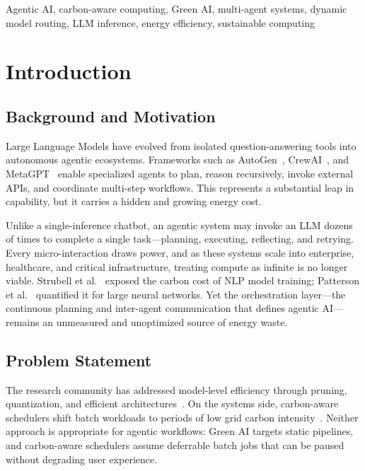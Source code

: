 \documentclass[journal]{IEEEtran}
\begin{document}
\begin{IEEEkeywords}
Agentic AI, carbon-aware computing, Green AI, multi-agent systems, dynamic
model routing, LLM inference, energy efficiency, sustainable computing
\end{IEEEkeywords}

\section{Introduction}

\subsection{Background and Motivation}

Large Language Models have evolved from isolated question-answering tools into
autonomous agentic ecosystems. Frameworks such as AutoGen~\cite{wu2023autogen},
CrewAI~\cite{moura2023crewai}, and MetaGPT~\cite{hong2024metagpt} enable
specialized agents to plan, reason recursively, invoke external APIs, and
coordinate multi-step workflows. This represents a substantial leap in
capability, but it carries a hidden and growing energy cost.

Unlike a single-inference chatbot, an agentic system may invoke an LLM dozens
of times to complete a single task—planning, executing, reflecting, and
retrying. Every micro-interaction draws power, and as these systems scale into
enterprise, healthcare, and critical infrastructure, treating compute as
infinite is no longer viable. Strubell et al.~\cite{strubell2019energy} exposed
the carbon cost of NLP model training; Patterson et al.~\cite{patterson2021carbon}
quantified it for large neural networks. Yet the orchestration layer—the
continuous planning and inter-agent communication that defines agentic AI—
remains an unmeasured and unoptimized source of energy waste.

\subsection{Problem Statement}

The research community has addressed model-level efficiency through pruning,
quantization, and efficient architectures~\cite{han2016deep,schwartz2020green}.
On the systems side, carbon-aware schedulers shift batch workloads to periods of
low grid carbon intensity~\cite{radovanovic2022carbon,wiesner2021lets}. Neither
approach is appropriate for agentic workflows: Green AI targets static pipelines,
and carbon-aware schedulers assume deferrable batch jobs that can be paused
without degrading user experience.
\end{document}
